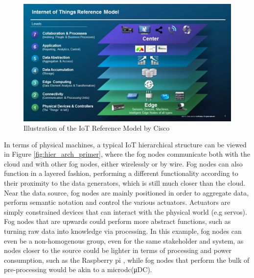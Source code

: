 \begin{figure}[h]
    \centering
    \includegraphics[width=\textwidth]{images/iotArchCisco.jpg}
    \caption{Illustration of the IoT Reference Model by Cisco\cite{iot-reference}}
    \label{fig:iotarchsisco}
\end{figure}

In terms of physical machines, a typical IoT hierarchical structure can be viewed in Figure \ref{fig:hier_arch_primer}, where the fog nodes communicate both with the cloud and with other fog nodes, either wirelessly or by wire.  Fog nodes can also function in a layered fashion, performing a different functionality according to their proximity to the data generators, which is still much closer than the cloud. Near the data source, fog nodes are mainly positioned in order to aggregate data, perform semantic notation and control the various actuators. Actuators are simply constrained devices that can interact with the physical world (e.g servos). Fog nodes that are upwards could perform more abstract functions, such as turning raw data into knowledge via processing. In this example, fog nodes can even be a non-homogenous group, even for the same stakeholder and system, as nodes closer to the source could be lighter in terms of processing and power consumption, such as the Raspberry pi \cite{rpi3}, while fog nodes that perform the bulk of pre-processing would be akin to a  \gls{microdc}(μDC).


